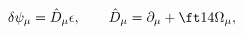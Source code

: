 \begin{equation}
\delta\psi_\mu=\hat D_\mu\epsilon,\qquad
\hat D_\mu=\partial_\mu+\ft14\Omega_\mu,
\end{equation}

